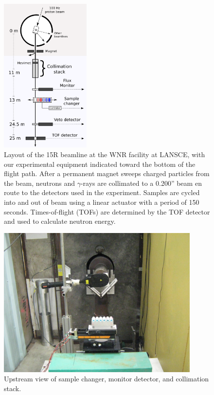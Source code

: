 \begin{figure}[ht!]
    \centering
    \includegraphics[width=0.4\textwidth]{figures/ExperimentalSetup.png}
    \caption[Layout of the 15R beamline at the WNR facility at LANSCE]
        {Layout of the 15R beamline at the WNR facility at LANSCE, with our
    experimental equipment indicated toward the bottom of the flight path.
    After a permanent magnet sweeps charged particles from the beam, neutrons and
    $\gamma$-rays are collimated to a 0.200'' beam en route to the
    detectors used in the experiment. Samples are cycled into and out of beam
    using a linear actuator with a period of 150 seconds. Times-of-flight (TOFs) are
    determined by the TOF detector and used to calculate neutron energy.
}
    \label{ExperimentalApparatus}
\end{figure}

\begin{figure}[ht!]
    \centering
    \includegraphics[width=0.9\textwidth]{figures/UpstreamTowardCollimator.jpg}
    \caption[Sample changer, monitor detector, and collimation stack]
    {Upstream view of sample changer, monitor detector, and collimation stack.}
    \label{BeamlineSampleChanger}
\end{figure}

